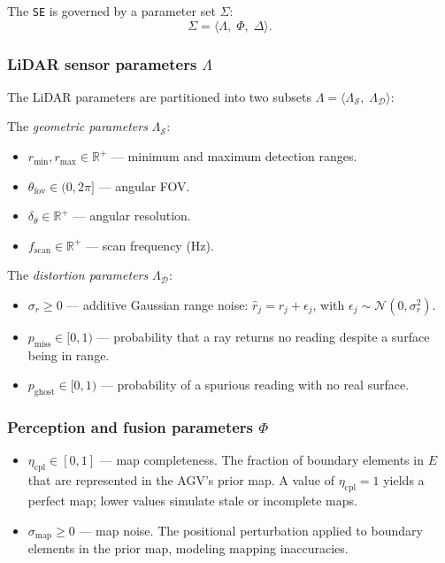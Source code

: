 \documentclass[conference]{IEEEtran}
\begin{document}
The \texttt{SE} is governed by a parameter set $\Sigma$:
\begin{equation}
\label{eq:sigma}
    \Sigma = \langle \Lambda,\; \Phi,\; \Delta \rangle.
\end{equation}

\subsubsection{LiDAR sensor parameters $\Lambda$}
\label{sec:lidar-params}
The LiDAR parameters are partitioned into two subsets $\Lambda = \langle \Lambda_{\mathcal{S}},\; \Lambda_{\mathcal{D}} \rangle$:
 
The \emph{geometric parameters} $\Lambda_{\mathcal{S}}$:
\begin{itemize}
    \item $r_{\min}, r_{\max} \in \mathbb{R}^+$ --- minimum and maximum detection ranges.
    \item $\theta_{\text{fov}} \in (0, 2\pi]$ --- angular FOV.
    \item $\delta_\theta \in \mathbb{R}^+$ --- angular resolution.
    \item $f_{\text{scan}} \in \mathbb{R}^+$ --- scan frequency (Hz).
\end{itemize}
 
The \emph{distortion parameters} $\Lambda_{\mathcal{D}}$:
\begin{itemize}
    \item $\sigma_r \geq 0$ --- additive Gaussian range noise: $\hat{r}_j = r_j + \epsilon_j$, with $\epsilon_j \sim \mathcal{N}(0, \sigma_r^2)$.
    \item $p_{\text{miss}} \in [0, 1)$ --- probability that a ray returns no reading despite a surface being in range.
    \item $p_{\text{ghost}} \in [0, 1)$ --- probability of a spurious reading with no real surface.
\end{itemize}
 
\subsubsection{Perception and fusion parameters $\Phi$}
\begin{itemize}
    \item $\eta_{\text{cpl}} \in [0, 1]$ --- map completeness. The fraction of boundary elements in $E$ that are represented in the AGV's prior map. A value of $\eta_{\text{cpl}} = 1$ yields a perfect map; lower values simulate stale or incomplete maps.
    \item $\sigma_{\text{map}} \geq 0$ --- map noise. The positional perturbation applied to boundary elements in the prior map, modeling mapping inaccuracies.
\end{itemize}
 
\end{document}
